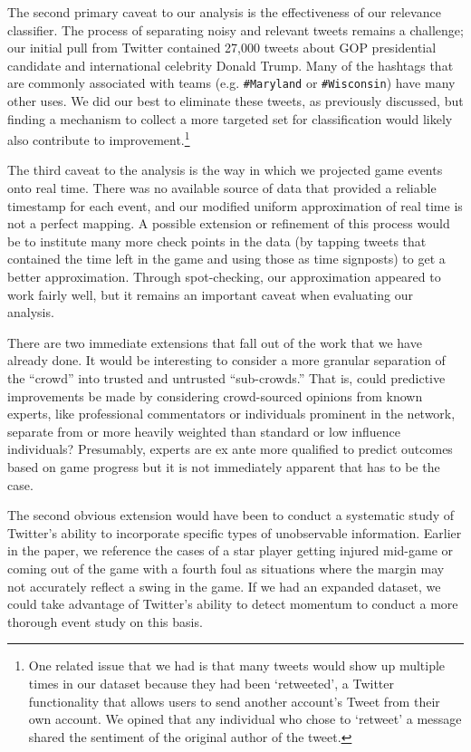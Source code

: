 \documentclass[12pt]{article}
\begin{document}
\begin{doublespacing}
The second primary caveat to our analysis is the effectiveness of our relevance classifier. The process of separating noisy and relevant tweets remains a challenge; our initial pull from Twitter contained 27,000 tweets about GOP presidential candidate and international celebrity Donald Trump. Many of the hashtags that are commonly associated with teams (e.g. \texttt{\#Maryland} or \texttt{\#Wisconsin}) have many other uses. We did our best to eliminate these tweets, as previously discussed, but finding a mechanism to collect a more targeted set for classification would likely also contribute to improvement.\footnote{One related issue that we had is that many tweets would show up multiple times in our dataset because they had been `retweeted', a Twitter functionality that allows users to send another account's Tweet from their own account. We opined that any individual who chose to `retweet' a message shared the sentiment of the original author of the tweet.} 

The third caveat to the analysis is the way in which we projected game events onto real time. There was no available source of data that provided a reliable timestamp for each event, and our modified uniform approximation of real time is not a perfect mapping. A possible extension or refinement of this process would be to institute many more check points in the data (by tapping tweets that contained the time left in the game and using those as time signposts) to get a better approximation. Through spot-checking, our approximation appeared to work fairly well, but it remains an important caveat when evaluating our analysis. 

There are two immediate extensions that fall out of the work that we have already done. It would be interesting to consider a more granular separation of the ``crowd'' into trusted and untrusted ``sub-crowds.'' That is, could predictive improvements be made by considering crowd-sourced opinions from known experts, like professional commentators or individuals prominent in the network, separate from or more heavily weighted than standard or low influence individuals? Presumably, experts are ex ante more qualified to predict outcomes based on game progress but it is not immediately apparent that has to be the case.

The second obvious extension would have been to conduct a systematic study of Twitter's ability to incorporate specific types of unobservable information. Earlier in the paper, we reference the cases of a star player getting injured mid-game or coming out of the game with a fourth foul as situations where the margin may not accurately reflect a swing in the game. If we had an expanded dataset, we could take advantage of Twitter's ability to detect momentum to conduct a more thorough event study on this basis. 


\end{doublespacing}
\end{document}
